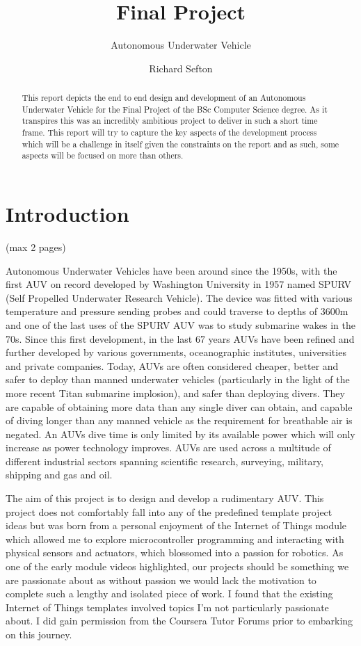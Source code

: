 \documentclass[11pt,a4paper,titlepage]{report}
\title{Final Project}
\subtitle{Autonomous Underwater Vehicle}
\author{Richard Sefton}
\begin{document}
	\maketitle
	\tableofcontents
	
	\begin{abstract}
		This report depicts the end to end design and development of an Autonomous Underwater Vehicle for the Final Project of the BSc Computer Science degree. As it transpires this was an incredibly ambitious project to deliver in such a short time frame. This report will try to capture the key aspects of the development process which will be a challenge in itself given the constraints on the report and as such, some aspects will be focused on more than others.  
	\end{abstract}
	
	\chapter*{Introduction} (max 2 pages)
	Autonomous Underwater Vehicles have been around since the 1950s, with the first AUV on record developed by Washington University in 1957 named SPURV\cite{SPURV} (Self Propelled Underwater Research Vehicle). The device was fitted with various temperature and pressure sending probes and could traverse to depths of 3600\unit{\meter} and one of the last uses of the SPURV AUV was to study submarine wakes in the 70s. Since this first development, in the last 67 years AUVs have been refined and further developed by various governments, oceanographic institutes, universities and private companies. Today, AUVs are often considered cheaper, better and safer to deploy than manned underwater vehicles (particularly in the light of the more recent Titan submarine implosion\cite{TITAN_IMPLOSION}), and safer than deploying divers. They are capable of obtaining more data than any single diver can obtain, and capable of diving longer than any manned vehicle as the requirement for breathable air is negated. An AUVs dive time is only limited by its available power which will only increase as power technology improves. AUVs are used across a multitude of different industrial sectors spanning scientific research, surveying, military, shipping and gas and oil\cite{AUV_MARKETSHARE}. 
	
	The aim of this project is to design and develop a rudimentary AUV. This project does not comfortably fall into any of the predefined template project ideas but was born from a personal enjoyment of the Internet of Things module which allowed me to explore microcontroller programming and interacting with physical sensors and actuators, which blossomed into a passion for robotics. As one of the early module videos highlighted, our projects should be something we are passionate about as without passion we would lack the motivation to complete such a lengthy and isolated piece of work\cite{COURSERA_PROJECT_VIDEO}. I found that the existing Internet of Things templates involved topics I'm not particularly passionate about. I did gain permission from the Coursera Tutor Forums prior to embarking on this journey\cite{COURSERA_PROJECT_PERMISSION}.
	
\end{document}

